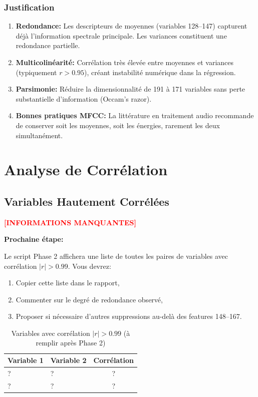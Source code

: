 \documentclass[11pt,a4paper,french]{report}
\begin{document}
\subsubsection*{Justification}

\begin{enumerate}
    \item \textbf{Redondance:} Les descripteurs de moyennes (variables 128--147) capturent déjà l'information spectrale principale. Les variances constituent une redondance partielle.
    
    \item \textbf{Multicolinéarité:} Corrélation très élevée entre moyennes et variances (typiquement $r > 0.95$), créant instabilité numérique dans la régression.
    
    \item \textbf{Parsimonie:} Réduire la dimensionnalité de 191 à 171 variables sans perte substantielle d'information (Occam's razor).
    
    \item \textbf{Bonnes pratiques MFCC:} La littérature en traitement audio recommande de conserver soit les moyennes, soit les énergies, rarement les deux simultanément.
\end{enumerate}

\section{Analyse de Corrélation}

\subsection{Variables Hautement Corrélées}

\textcolor{red}{\textbf{[INFORMATIONS MANQUANTES]}}

\textbf{Prochaine étape:}

Le script Phase 2 affichera une liste de toutes les paires de variables avec corrélation $|r| > 0.99$. Vous devrez:

\begin{enumerate}
    \item Copier cette liste dans le rapport,
    \item Commenter sur le degré de redondance observé,
    \item Proposer si nécessaire d'autres suppressions au-delà des features 148--167.
\end{enumerate}

\begin{table}[H]
\centering
\caption{Variables avec corrélation $|r| > 0.99$ (à remplir après Phase 2)}
\begin{tabular}{|l|l|c|}
\hline
\textbf{Variable 1} & \textbf{Variable 2} & \textbf{Corrélation} \\
\hline
? & ? & ? \\
? & ? & ? \\
\hline
\end{tabular}
\label{tab:high_corr}
\end{table}
\end{document}
